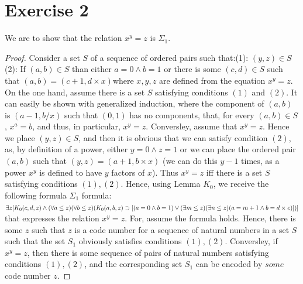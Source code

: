 \documentclass{article}
\theoremstyle{definition}
\begin{document}
\section*{Exercise 2}
We are to show that the relation $x^y=z$ is $\Sigma_1$.
\begin{proof}
Consider a set $S$ of a sequence of ordered pairs such that:\newline (1): $(y,z)\in S$\newline (2): If $(a,b)\in S$ than either $a=0\wedge b=1$ or 
there is some $(c,d)\in S$ such that $(a,b)=(c+1,d\times x)$\newline where $x,y,z$ are defined from the equation $x^y=z$. On the one hand, assume there is 
a set $S$ satisfying conditions $(1)$ and $(2)$. It can easily be shown with generalized induction, where the component of $(a,b)$ is $(a-1,b/x)$ such that
$(0,1)$ has no components, that, for every $(a,b)\in S$, $x^a=b$, and thus, in 
particular, $x^y=z$. Conversley, assume that $x^y=z$. Hence we place $(y,z)\in S$, and then it is obvious that we can satisfy condition $(2)$, as, by 
definition of a power, either $y=0\wedge z=1$ or we can place the ordered pair $(a,b)$ such that $(y,z)=(a+1,b\times x)$ (we can do this $y-1$ times, as 
a power $x^y$ is defined to have $y$ factors of $x$). Thus $x^y=z$ iff there is a set $S$ satisfying conditions $(1), (2)$. 
 Hence, using Lemma $K_0$, we receive the following formula $\Sigma_1$ formula:\newline
$\exists z[K_0(c,d,z)\wedge (\forall a\le z)(\forall b\le z)(K_0(a,b,z)\supset\newline [(a=0\wedge b=1)\vee (\exists m\le z)(\exists n\le z)
(a=m+1\wedge b=d\times e)])]$\newline
that expresses the relation $x^y=z$. 
For, assume the formula holds. Hence, there is some $z$ such that $z$ is a code number for a sequence of natural 
numbers in a set $S$ such that the set $S_1$ obviously satisfies conditions $(1), (2)$. Conversley, if $x^y=z$, then there is some sequence of pairs of
 natural numbers satisfying conditions $(1), (2)$, and the corresponding set $S_1$ can be encoded by $some$ code number $z$.
\end{proof}
\end{document}
